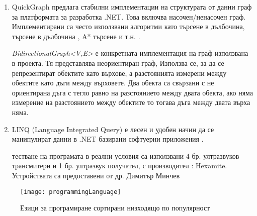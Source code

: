 \begin{enumerate}
    \item QuickGraph предлага стабилни имплементации на структурата от данни граф за платформата за разработка .NET. Това включва насочен/ненасочен граф. Имплементирани са често използвани алгоритми като търсене в дълбочина, търсене в дълбочина , A* търсене и т.н. \cite{quickgraph}.
    
    \textit{BidirectionalGraph<V,E>} е конкретната имплементация на граф използвана в проекта.  Тя представлява неориентиран граф, Използва се, за да се репрезентират обектите като върхове, а разстоянията измерени между обектите като дъги между върховете. Два обекта са свързани с не ориентирана дъга с тегло равно на разстоянието между двата обекта, ако няма измерение на разстоянието между обектите то тогава дъга между двата върха няма.
    
    \item LINQ (Language Integrated Query) е лесен и удобен начин да се манипулират данни в .NET базирани софтуерни приложения \cite{linq}. 
    
     тестване на програмата в реални условия са използвани 4 бр. ултразвуков трансмитери и 1 бр. ултразвук получател, с производител : Hexamite. Устройствата са предоставени от др. Димитър Минчев

    
\end{enumerate}


\begin{figure}
    \centering
    \texttt{[image: programmingLanguage]}
    \caption{Езици за програмиране сортирани низходящо по популярност}
    \label{fig:prog}
\end{figure}
